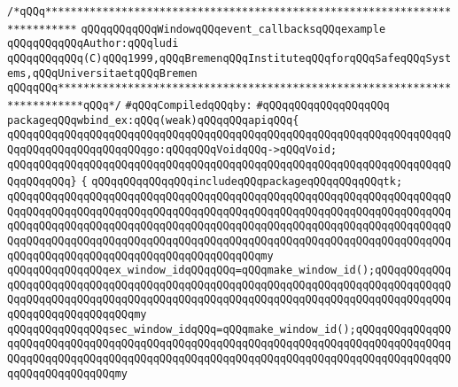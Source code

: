 \label{src/lib/tk/src/tests+examples/wbind_ex.pkg}
\verb|/*qQQq***************************************************************************|\newline
\verb|qQQqqQQqqQQqWindowqQQqevent_callbacksqQQqexample|\newline
\verb|qQQqqQQqqQQqAuthor:qQQqludi|\newline
\verb|qQQqqQQqqQQq(C)qQQq1999,qQQqBremenqQQqInstituteqQQqforqQQqSafeqQQqSystems,qQQqUniversitaetqQQqBremen|\newline
\verb|qQQqqQQq**************************************************************************qQQq*/|\newline
\newline
\verb|#qQQqCompiledqQQqby:|\newline
\verb|#qQQqqQQqqQQqqQQqqQQq|\newline
\newline
\newline
\verb|packageqQQqwbind_ex:qQQq(weak)qQQqqQQqapiqQQq{|\newline
\verb|qQQqqQQqqQQqqQQqqQQqqQQqqQQqqQQqqQQqqQQqqQQqqQQqqQQqqQQqqQQqqQQqqQQqqQQqqQQqqQQqqQQqqQQqqQQqgo:qQQqqQQqVoidqQQq->qQQqVoid;|\newline
\verb|qQQqqQQqqQQqqQQqqQQqqQQqqQQqqQQqqQQqqQQqqQQqqQQqqQQqqQQqqQQqqQQqqQQqqQQqqQQqqQQq}|\newline
\newline
\verb|{|\newline
\verb|qQQqqQQqqQQqqQQqincludeqQQqpackageqQQqqQQqqQQqtk;|\newline
\verb|qQQqqQQqqQQqqQQqqQQqqQQqqQQqqQQqqQQqqQQqqQQqqQQqqQQqqQQqqQQqqQQqqQQqqQQqqQQqqQQqqQQqqQQqqQQqqQQqqQQqqQQqqQQqqQQqqQQqqQQqqQQqqQQqqQQqqQQqqQQqqQQqqQQqqQQqqQQqqQQqqQQqqQQqqQQqqQQqqQQqqQQqqQQqqQQqqQQqqQQqqQQqqQQqqQQqqQQqqQQqqQQqqQQqqQQqqQQqqQQqqQQqqQQqqQQqqQQqqQQqqQQqqQQqqQQqqQQqqQQqqQQqqQQqqQQqqQQqqQQqqQQqqQQqqQQqqQQqqQQqmy|\newline
\verb|qQQqqQQqqQQqqQQqex_window_idqQQqqQQq=qQQqmake_window_id();qQQqqQQqqQQqqQQqqQQqqQQqqQQqqQQqqQQqqQQqqQQqqQQqqQQqqQQqqQQqqQQqqQQqqQQqqQQqqQQqqQQqqQQqqQQqqQQqqQQqqQQqqQQqqQQqqQQqqQQqqQQqqQQqqQQqqQQqqQQqqQQqqQQqqQQqqQQqqQQqqQQqqQQqqQQqmy|\newline
\verb|qQQqqQQqqQQqqQQqsec_window_idqQQq=qQQqmake_window_id();qQQqqQQqqQQqqQQqqQQqqQQqqQQqqQQqqQQqqQQqqQQqqQQqqQQqqQQqqQQqqQQqqQQqqQQqqQQqqQQqqQQqqQQqqQQqqQQqqQQqqQQqqQQqqQQqqQQqqQQqqQQqqQQqqQQqqQQqqQQqqQQqqQQqqQQqqQQqqQQqqQQqqQQqqQQqmy|\newline
